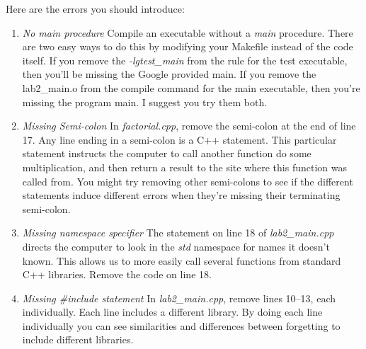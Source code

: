 \documentclass[nobib]{tufte-handout}
\begin{document}
Here are the errors you should introduce:
\begin{enumerate}

\item \textit{No main procedure} \newline
Compile an executable without a \textit{main} procedure. There are two easy ways to do this by modifying your Makefile instead of the code itself.  If you remove the \textit{-lgtest\_main} from the rule for the test executable, then you'll be missing the Google provided main. If you remove the lab2\_main.o from the compile command for the main executable, then you're missing the program main.  I suggest you try them both.

\item \textit{Missing Semi-colon} \newline
In \textit{factorial.cpp}, remove the semi-colon at the end of line 17. Any line ending in a semi-colon is a C++ statement. This particular statement instructs the computer to call another function do some multiplication, and then return a result to the site where this function was called from. You might try removing other semi-colons to see if the different statements induce different errors when they're missing their terminating semi-colon.

\item \textit{Missing namespace specifier} \newline
The statement on line 18 of \textit{lab2\_main.cpp} directs the computer to look in the \textit{std} namespace for names it doesn't known. This allows us to more easily call several functions from standard C++ libraries. Remove the code on line 18.

\item \textit{Missing \#include statement} \newline
In \textit{lab2\_main.cpp}, remove lines 10--13, each individually. Each line includes a different library. By doing each line individually you can see similarities and differences between forgetting to include different libraries.



\end{enumerate}
\end{document}
